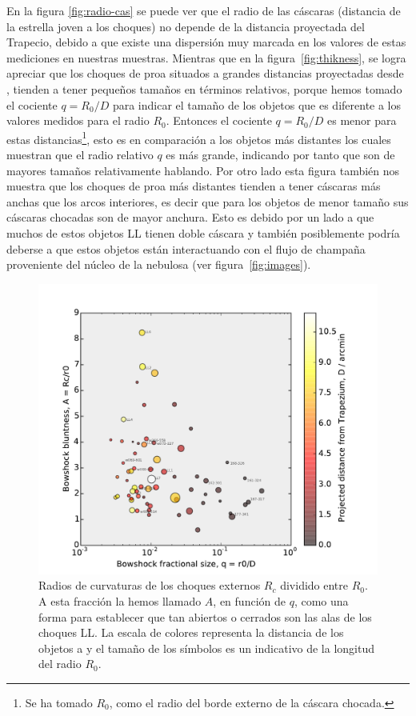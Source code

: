  En la figura \ref{fig:radio-cas} se puede ver que el radio de las cáscaras (distancia de la estrella joven a los choques) no depende de la distancia proyectada del Trapecio, debido a que existe una dispersión muy marcada en los valores de estas mediciones en nuestras muestras. Mientras que en la figura~\ref{fig:thikness}, se logra apreciar que los choques de proa situados a grandes distancias  proyectadas desde \thC{}, tienden a tener  pequeños tamaños en términos relativos, porque hemos tomado el cociente \(q = R_{0}/D\) para indicar el tamaño de los objetos que es diferente a los valores medidos para el radio \(R_{0}\).  Entonces el cociente \(q = R_{0}/D\) es menor para estas distancias\footnote{Se ha tomado \(R_{0}\), como el radio del borde externo de la cáscara chocada.}, esto es en comparación a los objetos más distantes los cuales muestran que el radio relativo \(q\) es más grande, indicando por tanto que son de mayores tamaños relativamente hablando. Por otro lado esta figura también nos muestra que los choques de proa más distantes tienden a tener cáscaras más anchas que los arcos interiores, es decir que para los objetos de menor tamaño sus cáscaras chocadas son de mayor anchura. Esto es debido por un lado a que muchos de estos objetos LL tienen doble cáscara y también posiblemente podría deberse a que estos objetos están interactuando con el flujo de champaña proveniente del núcleo de la nebulosa (ver figura~\ref{fig:images}).\\ 

\begin{figure}
  \centering
  \includegraphics[width=\linewidth]{luis-programas/will-A-vs-q}
  \caption{Radios de curvaturas de los choques externos \(R_{c}\) dividido entre \(R_{0}\). A esta fracción la hemos llamado \(A\), en función de \(q\), como una forma para establecer que tan abiertos o cerrados son las alas de los choques LL. La escala de colores representa la distancia de los objetos a \thC{} y el tamaño de los símbolos es un indicativo de la longitud del radio \(R_{0}\).}
  \label{fig:radii-curvatures}
\end{figure} 

